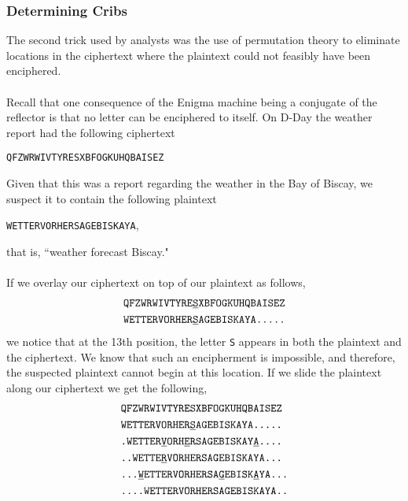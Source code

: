 \subsubsection{Determining Cribs}
The second trick used by analysts was the use of permutation theory to
eliminate locations in the ciphertext where the plaintext could not
feasibly have been enciphered.
\\\\Recall that one consequence of the Enigma machine being a
conjugate of the reflector is that no letter can be enciphered to
itself. On D-Day the weather report had the following ciphertext
\begin{center}
  \texttt{QFZWRWIVTYRESXBFOGKUHQBAISEZ}
\end{center}
Given that this was a report regarding the weather in the Bay of Biscay, we
suspect it to contain the following plaintext
\begin{center}
  \texttt{WETTERVORHERSAGEBISKAYA},
\end{center}
that is, ``weather forecast Biscay."
\\\\If we overlay our ciphertext on top of our plaintext as follows,
\begin{align*}
  & \texttt{QFZWRWIVTYRE}{\uline{\texttt{S}}}\texttt{XBFOGKUHQBAISEZ} \\
  & \texttt{WETTERVORHER}{\uline{\texttt{S}}}\texttt{AGEBISKAYA.....}
\end{align*}
we notice that at the 13th position, the letter \texttt{S} appears in
both the plaintext and the ciphertext. We know that such an
encipherment is impossible, and therefore, the suspected plaintext
cannot begin at this location. If we slide the plaintext along our
ciphertext we get the following,
\begin{align*}
  & \texttt{QFZWRWIVTYRESXBFOGKUHQBAISEZ}
  \\
  & \texttt{WETTERVORHER}{\uline{\texttt{S}}}\texttt{AGEBISKAYA.....}
  \\
  &
  \texttt{.WETTER}{\uline{\texttt{V}}}\texttt{ORH}{\uline{\texttt{E}}}\texttt{RSAGEBISKAY}{\uline{\texttt{A}}}\texttt{....}
  \\
  & \texttt{..WETTE}{\uline{\texttt{R}}}\texttt{VORHERSAGEBISKAYA...}
  \\
  &
  \texttt{...}{\uline{\texttt{W}}}\texttt{ETTERVORHERSA}{\uline{\texttt{G}}}\texttt{EBISK}{\uline{\texttt{A}}}\texttt{YA...}
  \\
  & \texttt{....WETTERVORHERSAGEBISKAYA..}
  \\
\end{align*}
